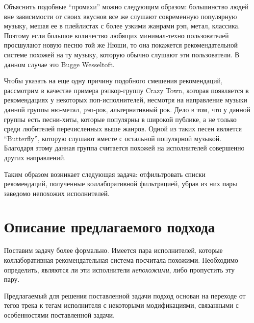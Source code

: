 Объяснить подобные ``промахи'' можно следующим образом: большинство людей вне зависимости от своих вкуснов все же слушают современную популярную
музыку, мешая ее в плейлистах с более узкими жанрами \ld рэп, метал, классика. Поэтому если большое количество любящих минимал-техно пользователей 
просшулают новую песню той же Нюши, то она покажется рекомендательной системе похожей на ту музыку, которую обычно слушают эти пользователи. В данном
случае это Bugge Wesseltoft.

Чтобы указать на еще одну причину подобного смешения рекомендаций, рассмотрим в качестве примера рэпкор-группу Crazy Town, которая появляется в 
рекомендациях у некоторых поп-исполнителей, несмотря на направление музыки данной группы \ld ню-метал, рэп-рок, альтернативный рок. Дело в том,
что у данной группы есть песни-хиты, которые популярны в широкой публике, а не только среди любителей перечисленных выше жанров. Одной из таких песен
является ``Butterfly'', которую слушают вместе с остальной популярной музыкой. Благодаря этому данная группа считается похожей на исполнителей
совершенно других направлений.

Таким образом возникает следующая задача: отфильтровать списки рекомендаций, полученные коллаборативной фильтрацией, убрав из них пары заведомо 
непохожих исполнителей.

\section{Описание предлагаемого подхода}

Поставим задачу более формально. Имеется пара исполнителей, которые коллаборативная рекомендательная система посчитала похожими. 
Необходимо определить, являются ли эти исполнители \emph{непохожими}, либо пропустить эту пару. 

Предлагаемый для решения поставленной задачи подход основан на переходе от тегов трека к тегам исполнителя с некоторыми модификациями, 
связанными с особенностями поставленной задачи. 

